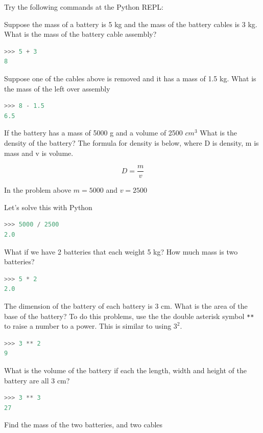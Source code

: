 \documentclass{book}
\begin{document}
Try the following commands at the Python REPL:

Suppose the mass of a battery is 5 kg and the mass of the battery cables
is 3 kg. What is the mass of the battery cable assembly?

\begin{lstlisting}[language=Python]
>>> 5 + 3
8
\end{lstlisting}

Suppose one of the cables above is removed and it has a mass of 1.5 kg.
What is the mass of the left over assembly

\begin{lstlisting}[language=Python]
>>> 8 - 1.5
6.5
\end{lstlisting}

If the battery has a mass of 5000 g and a volume of 2500 \(cm^3\) What
is the density of the battery? The formula for density is below, where D
is density, m is mass and v is volume.

\[ D = \frac{m}{v} \]

In the problem above \(m = 5000\) and \(v=2500\)

Let's solve this with Python

\begin{lstlisting}[language=Python]
>>> 5000 / 2500
2.0
\end{lstlisting}

What if we have 2 batteries that each weight 5 kg? How much mass is two
batteries?

\begin{lstlisting}[language=Python]
>>> 5 * 2
2.0
\end{lstlisting}

The dimension of the battery of each battery is 3 cm. What is the area
of the base of the battery? To do this problems, use the the double
asterisk symbol \lstinline!**! to raise a number to a power. This is
similar to using \(3^2\).

\begin{lstlisting}[language=Python]
>>> 3 ** 2
9
\end{lstlisting}

What is the volume of the battery if each the length, width and height
of the battery are all 3 cm?

\begin{lstlisting}[language=Python]
>>> 3 ** 3
27
\end{lstlisting}

Find the mass of the two batteries, and two cables
\end{document}
